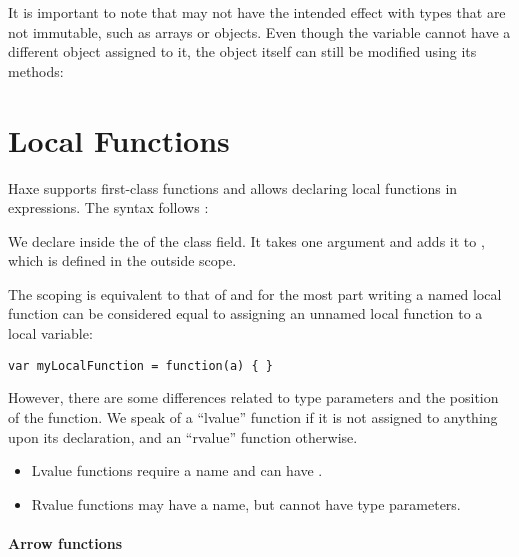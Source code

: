 
It is important to note that  may not have the intended effect with types that are not immutable, such as arrays or objects. Even though the variable cannot have a different object assigned to it, the object itself can still be modified using its methods:



\section{Local Functions}
\label{expression-function}

Haxe supports first-class functions and allows declaring local functions in expressions. The syntax follows :


We declare  inside the  of the  class field. It takes one argument  and adds it to , which is defined in the outside scope.

The scoping is equivalent to that of  and for the most part writing a named local function can be considered equal to assigning an unnamed local function to a local variable:

\begin{lstlisting}
var myLocalFunction = function(a) { }
\end{lstlisting}

However, there are some differences related to type parameters and the position of the function. We speak of a ``lvalue'' function if it is not assigned to anything upon its declaration, and an ``rvalue'' function otherwise.

\begin{itemize}
	\item Lvalue functions require a name and can have .
	\item Rvalue functions may have a name, but cannot have type parameters.
\end{itemize}


\label{expression-arrow-function}
\paragraph{Arrow functions}

